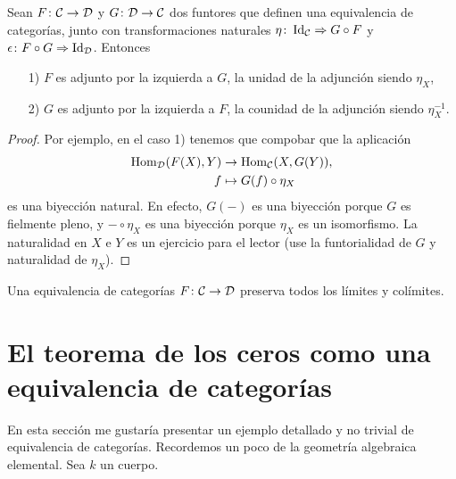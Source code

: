 \documentclass{article}
\numberwithin{equation}{section}
\theoremstyle{definition}
\begin{document}
\begin{observacion}
  \label{obs:equivalencia-adjunta-por-ambos-lados}
  Sean $F\colon \mathcal{C} \to \mathcal{D}$ y $G\colon \mathcal{D} \to \mathcal{C}$
  dos funtores que definen una equivalencia de categorías, junto con
  transformaciones naturales $\eta\colon \operatorname{Id}_\mathcal{C} \Rightarrow G\circ F$ y
  $\epsilon\colon F\circ G \Rightarrow \operatorname{Id}_\mathcal{D}$. Entonces

  \begin{enumerate}
  \item[1)] $F$ es adjunto por la izquierda a $G$, la unidad de la adjunción
    siendo $\eta_X$,

  \item[2)] $G$ es adjunto por la izquierda a $F$, la counidad de la adjunción
    siendo $\eta^{-1}_X$.
  \end{enumerate}

  \begin{proof}
    Por ejemplo, en el caso 1) tenemos que compobar que la aplicación
    \begin{align*}
      \operatorname{Hom}_\mathcal{D} (F (X), Y) & \to \operatorname{Hom}_\mathcal{C} (X, G (Y)),\\
      f & \mapsto G (f) \circ \eta_X
    \end{align*}
    es una biyección natural. En efecto, $G (-)$ es una biyección porque $G$ es
    fielmente pleno, y $-\circ \eta_X$ es una biyección porque $\eta_X$ es
    un isomorfismo. La naturalidad en $X$ e $Y$ es un ejercicio para el lector
    (use la funtorialidad de $G$ y naturalidad de $\eta_X$).
  \end{proof}
\end{observacion}

\begin{corolario}
  Una equivalencia de categorías $F\colon \mathcal{C} \to \mathcal{D}$ preserva
  todos los límites y colímites.
\end{corolario}


\section{El teorema de los ceros como una equivalencia de categorías}

En esta sección me gustaría presentar un ejemplo detallado y no trivial de
equivalencia de categorías. Recordemos un poco de la geometría algebraica
elemental. Sea $k$ un cuerpo.
\end{document}
